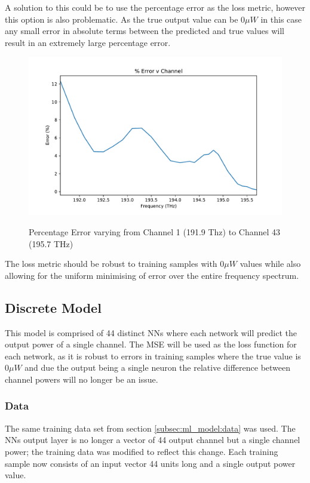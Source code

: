 A solution to this could be to use the percentage error as the loss metric, however this option is also problematic. As the true output value can be $0\mu W$ in this case any small error in absolute terms between the predicted and true values will result in an extremely large percentage error.

\begin{figure}[!h]
    \centering
    \caption{Percentage Error varying from Channel 1 (191.9 Thz) to Channel 43 (195.7 THz)}
    \includegraphics[width = \textwidth]{project/img/ml_model/pct_err_freq.pdf}
    \label{fig:ml_model:pct_err_freq}
\end{figure}

The loss metric should be robust to training samples with $0\mu W$ values while also allowing for the uniform minimising of error over the entire frequency spectrum. 



\FloatBarrier
\subsection{Discrete Model} \label{sub:sec:disc_mod}

This model is comprised of 44 distinct NNs where each network will predict the output power of a single channel. The MSE will be used as the loss function for each network, as it is robust to errors in training samples where the true value is $0\mu W$ and due the output being a single neuron the relative difference between channel powers will no longer be an issue.


\subsubsection{Data}
The same training data set from section \ref{subsec:ml_model:data} was used. The NNs output layer is no longer a vector of 44 output channel but a single channel power; the training data was modified to reflect this change. Each training sample now consists of an input vector 44 units long and a single output power value. 

